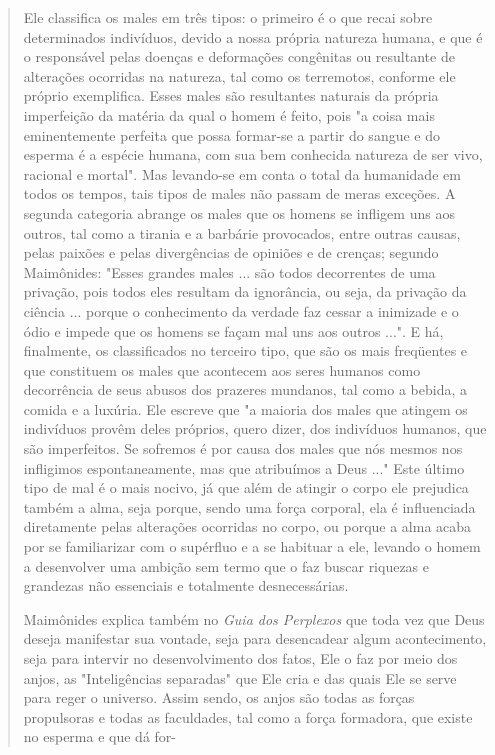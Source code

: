 \begin{quote}
Ele classifica os males em três tipos: o primeiro é o que recai sobre
determinados indivíduos, devido a nossa própria natureza humana, e que é
o responsável pelas doenças e deformações congênitas ou resultante de
altera­ções ocorridas na natureza, tal como os terremotos, conforme ele
próprio exem­plifica. Esses males são resultantes naturais da própria
imperfeição da matéria da qual o homem é feito, pois "a coisa mais
eminentemente perfeita que possa formar-se a partir do sangue e do
esperma é a espécie humana, com sua bem conhecida natureza de ser vivo,
racional e mortal". Mas levando-se em conta o total da humanidade em
todos os tempos, tais tipos de males não passam de meras exceções. A
segunda categoria abrange os males que os homens se infli­gem uns aos
outros, tal como a tirania e a barbárie provocados, entre outras causas,
pelas paixões e pelas divergências de opiniões e de crenças; segundo
Maimônides: "Esses grandes males ... são todos decorrentes de uma
privação, pois todos eles resultam da ignorância, ou seja, da privação
da ciência ... por­que o conhecimento da verdade faz cessar a inimizade
e o ódio e impede que os homens se façam mal uns aos outros ...". E há,
finalmente, os classificados no terceiro tipo, que são os mais
freqüentes e que constituem os males que acontecem aos seres humanos
como decorrência de seus abusos dos prazeres mundanos, tal como a
bebida, a comida e a luxúria. Ele escreve que "a maioria dos males que
atingem os indivíduos provêm deles próprios, quero dizer, dos indivíduos
humanos, que são imperfeitos. Se sofremos é por causa dos males que nós
mesmos nos infligimos espontaneamente, mas que atribuímos a Deus ..."
Este último tipo de mal é o mais nocivo, já que além de atingir o corpo
ele pre­judica também a alma, seja porque, sendo uma força corporal, ela
é influencia­da diretamente pelas alterações ocorridas no corpo, ou
porque a alma acaba por se familiarizar com o supérfluo e a se habituar
a ele, levando o homem a desenvolver uma ambição sem termo que o faz
buscar riquezas e grandezas não essenciais e totalmente desnecessárias.

Maimônides explica também no \emph{Guia dos Perplexos} que toda vez que
Deus deseja manifestar sua vontade, seja para desencadear algum
aconteci­mento, seja para intervir no desenvolvimento dos fatos, Ele o
faz por meio dos anjos, as "Inteligências separadas" que Ele cria e das
quais Ele se serve para reger o universo. Assim sendo, os anjos são
todas as forças propulsoras e todas as faculdades, tal como a força
formadora, que existe no esperma e que dá for-


\end{quote}
